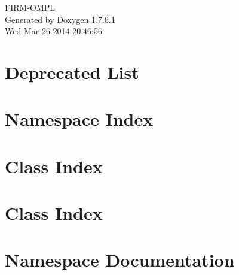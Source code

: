 \documentclass[a4paper]{book}
\begin{document}
\hypersetup{pageanchor=false,citecolor=blue}
\begin{titlepage}
\vspace*{7cm}
\begin{center}
{\Large \-F\-I\-R\-M-\/\-O\-M\-P\-L }\\
\vspace*{1cm}
{\large \-Generated by Doxygen 1.7.6.1}\\
\vspace*{0.5cm}
{\small Wed Mar 26 2014 20:46:56}\\
\end{center}
\end{titlepage}
\clearemptydoublepage
{}
\tableofcontents
\clearemptydoublepage
{}
\hypersetup{pageanchor=true,citecolor=blue}
\chapter{\-Deprecated \-List}
\label{deprecated}
\hypertarget{deprecated}{}

\chapter{\-Namespace \-Index}

\chapter{\-Class \-Index}

\chapter{\-Class \-Index}

\chapter{\-Namespace \-Documentation}

\end{document}

